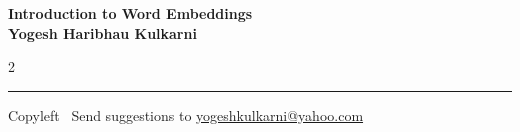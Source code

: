 \documentclass[8pt,landscape]{article}
\begin{document}
\footnotesize


\begin{center}
\Large{\textbf{Introduction to Word Embeddings\\ Yogesh Haribhau Kulkarni}}  
\end{center}

\begin{multicols}{2}


\end{multicols}

\rule{\linewidth}{0.25pt}
\scriptsize
Copyleft \textcopyleft\  Send suggestions to 
\href{http://yati.io}{yogeshkulkarni@yahoo.com}
\end{document}
